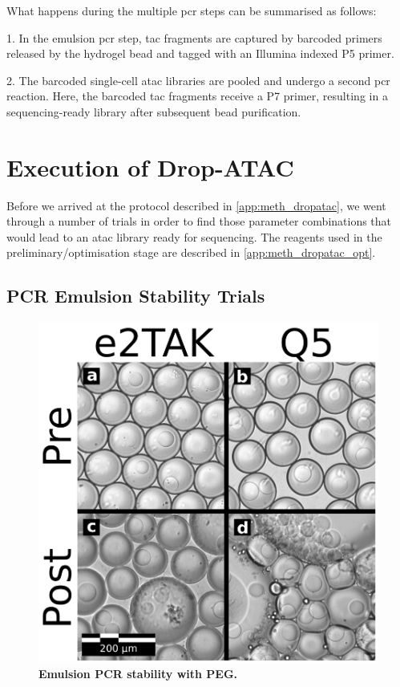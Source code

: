What happens during the multiple \acrshort{pcr} steps can be summarised as follows:\pms

1. In the emulsion \acrshort{pcr} step, \acrfull{tac} fragments are captured by barcoded primers released by the hydrogel bead and tagged with an Illumina indexed P5 primer.\pms

2. The barcoded single-cell \acrshort{atac} libraries are pooled and undergo a second \acrshort{pcr} reaction. Here, the barcoded \acrshort{tac} fragments receive a P7 primer, resulting in a sequencing-ready library after subsequent bead purification.\pms

\clearpage
\section{Execution of Drop-ATAC}
\label{sect:dropatac_execution}
Before we arrived at the protocol described in \ref{app:meth_dropatac}, we went through a number of trials in order to find those parameter combinations that would lead to an \acrshort{atac} library ready for sequencing. The reagents used in the preliminary/optimisation stage are described in \ref{app:meth_dropatac_opt}.

\subsection{PCR Emulsion Stability Trials}
%
\begin{figure}
\vspace{-10pt}
\centering
\includegraphics[width=\textwidth/3]{./ims/dropatac_stability1.png}
\caption[Emulsion PCR stability with PEG]{\textbf{Emulsion PCR stability with PEG.}}
\label{fig:dropatac_stability1}
\vspace{-15pt}
\end{figure}

